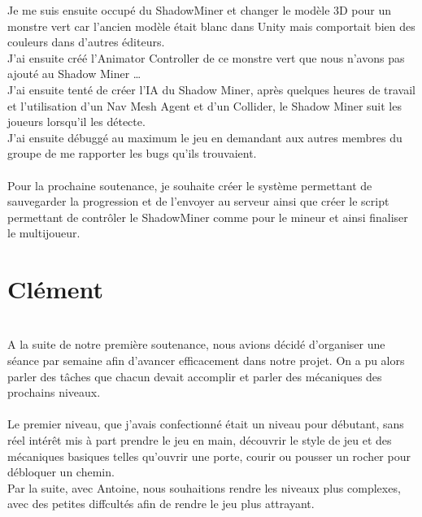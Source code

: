 \documentclass[titlepage, 13px, a4paper]{report}
\begin{document}
Je me suis ensuite occupé du ShadowMiner et changer le modèle 3D pour un monstre vert car l’ancien modèle 
était blanc dans Unity mais comportait bien des couleurs dans d’autres éditeurs. \\
J’ai ensuite créé l’Animator Controller de ce monstre vert que nous n’avons pas ajouté au Shadow Miner … \\
J’ai ensuite tenté de créer l’IA du Shadow Miner, après quelques heures de travail et l’utilisation d’un Nav Mesh Agent 
et d’un Collider, le Shadow Miner suit les joueurs lorsqu’il les détecte. \\
J’ai ensuite débuggé au maximum le jeu en demandant aux autres membres du groupe de me rapporter les bugs qu’ils trouvaient. \\ \\

Pour la prochaine soutenance, je souhaite créer le système permettant de sauvegarder la progression et de l’envoyer au 
serveur ainsi que créer le script permettant de contrôler le ShadowMiner comme pour le mineur et ainsi finaliser le multijoueur. \\



\newpage




\section{Clément}
\paragraph{} \hspace{0pt} \\
A la suite de notre première soutenance, nous avions décidé d'organiser une séance par semaine afin d'avancer efficacement dans notre projet.
On a pu alors parler des tâches que chacun devait accomplir et parler des mécaniques des prochains niveaux. \\ \\

Le premier niveau, que j'avais confectionné était un niveau pour débutant, sans réel intérêt mis à part prendre le jeu en main,
découvrir le style de jeu et des mécaniques basiques telles qu'ouvrir une porte, courir ou pousser un rocher pour débloquer un chemin. \\
Par la suite, avec Antoine, nous souhaitions rendre les niveaux plus complexes, avec des petites diffcultés 
afin de rendre le jeu plus attrayant. \\ \\
\end{document}
